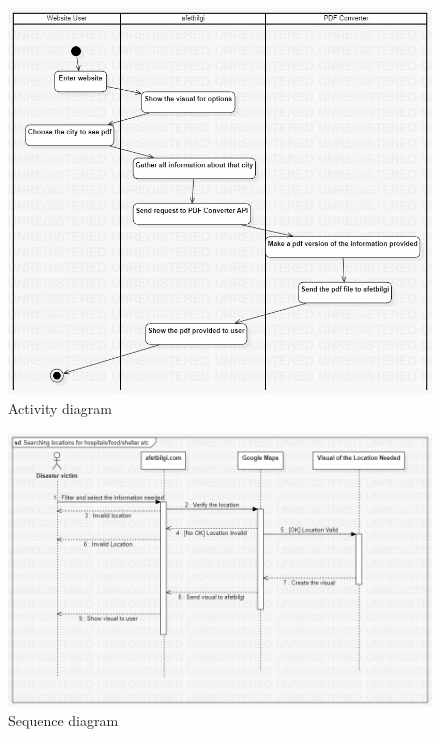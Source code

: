 \documentclass[12pt]{report}
\begin{document}
\begin{figure}[H]
    \includegraphics[scale=0.5]{act1}
    \centering
    \caption{Activity diagram}
\end{figure}

\begin{figure}[H]
    \includegraphics[scale=0.5]{seq1}
    \centering
    \caption{Sequence diagram}
\end{figure}
\end{document}
